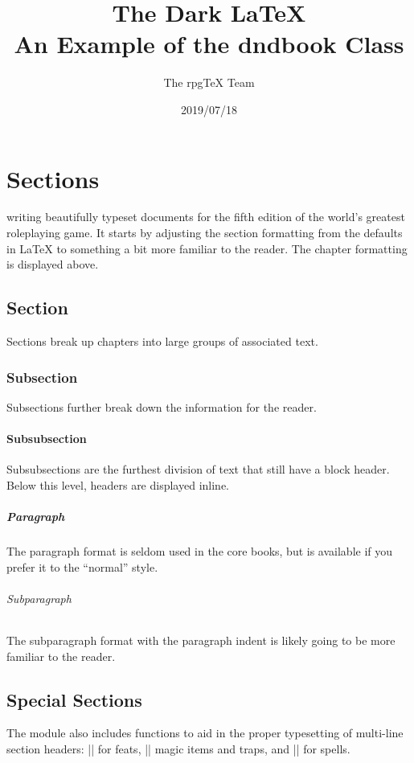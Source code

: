 \documentclass[letterpaper, landscape]{book}
\title{The Dark \LaTeX{} \\
\large An Example of the dndbook Class}
\author{The rpgTeX Team}
\date{2019/07/18}
\begin{document}
\frontmatter
\maketitle
\begingroup\let\newpage\relax\tableofcontents\endgroup
\mainmatter

\chapter{Sections}

 writing beautifully typeset documents for the fifth edition of the world's greatest roleplaying game. It starts by adjusting the section formatting from the defaults in \LaTeX{} to something a bit more familiar to the reader. The chapter formatting is displayed above.

\section{Section}
Sections break up chapters into large groups of associated text.

\subsection{Subsection}
Subsections further break down the information for the reader.

\subsubsection{Subsubsection}
Subsubsections are the furthest division of text that still have a block header. Below this level, headers are displayed inline.

\paragraph{Paragraph}
The paragraph format is seldom used in the core books, but is available if you prefer it to the ``normal'' style.

\subparagraph{Subparagraph}
The subparagraph format with the paragraph indent is likely going to be more familiar to the reader.

\section{Special Sections}
The module also includes functions to aid in the proper typesetting of multi-line section headers: |\DndFeatHeader| for feats, |\DndItemHeader| magic items and traps, and |\DndSpellHeader| for spells.
\end{document}
